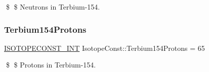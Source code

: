 \$ \$ Neutrons in Terbium-\/154. \mbox{\label{group___isotope_const-_terbium-_tb154_gaec1ec86cfa469a090fa8da95d9a5ca71}} 
\subsubsection{\texorpdfstring{Terbium154\+Protons}{Terbium154Protons}}
{\footnotesize\ttfamily \mbox{\hyperlink{group___isotope_const-_macros_ga5f18360b3e99483a35c32d789e62621c}{I\+S\+O\+T\+O\+P\+E\+C\+O\+N\+S\+T\+\_\+\+I\+NT}} Isotope\+Const\+::\+Terbium154\+Protons = 65}

\$ \$ Protons in Terbium-\/154. 